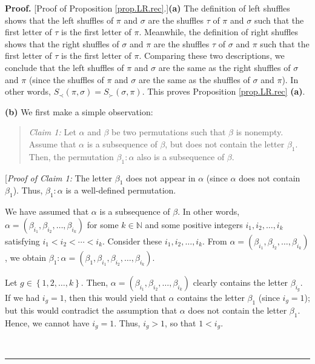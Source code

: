 \documentclass[numbers=enddot,12pt,final,onecolumn,notitlepage]{scrartcl}%
\theoremstyle{definition}
\newenvironment{statement}{\begin{quote}}{\end{quote}}
\newenvironment{proof}[1][Proof]{\noindent\textbf{#1.} }{\ \rule{0.5em}{0.5em}}
\newenvironment{verlong}{}{}
\begin{document}
\begin{verlong}
\begin{proof}
[Proof of Proposition \ref{prop.LR.rec}.]\textbf{(a)} The definition of left
shuffles shows that the left shuffles of $\pi$ and $\sigma$ are the shuffles
$\tau$ of $\pi$ and $\sigma$ such that the first letter of $\tau$ is the first
letter of $\pi$. Meanwhile, the definition of right shuffles shows that the
right shuffles of $\sigma$ and $\pi$ are the shuffles $\tau$ of $\sigma$ and
$\pi$ such that the first letter of $\tau$ is the first letter of $\pi$.
Comparing these two descriptions, we conclude that the left shuffles of $\pi$
and $\sigma$ are the same as the right shuffles of $\sigma$ and $\pi$ (since
the shuffles of $\pi$ and $\sigma$ are the same as the shuffles of $\sigma$
and $\pi$). In other words, $S_{\prec}\left(  \pi,\sigma\right)  =S_{\succ
}\left(  \sigma,\pi\right)  $. This proves Proposition \ref{prop.LR.rec}
\textbf{(a)}.

\textbf{(b)} We first make a simple observation:

\begin{statement}
\textit{Claim 1:} Let $\alpha$ and $\beta$ be two permutations such that
$\beta$ is nonempty. Assume that $\alpha$ is a subsequence of $\beta$,
but does not contain the letter $\beta_{1}$. Then, the permutation $\beta
_{1}:\alpha$ also is a subsequence of $\beta$.
\end{statement}

[\textit{Proof of Claim 1:} The letter $\beta_{1}$ does not appear in $\alpha$
(since $\alpha$ does not contain $\beta_{1}$). Thus, $\beta_{1}:\alpha$ is a
well-defined permutation.

We have assumed that $\alpha$ is a subsequence of $\beta$. In other
words, $\alpha=\left(  \beta_{i_{1}},\beta_{i_{2}},\ldots,\beta_{i_{k}%
}\right)  $ for some $k\in\mathbb{N}$ and some positive integers $i_{1}%
,i_{2},\ldots,i_{k}$ satisfying $i_{1}<i_{2}<\cdots<i_{k}$. Consider these
$i_{1},i_{2},\ldots,i_{k}$. From $\alpha=\left(  \beta_{i_{1}},\beta_{i_{2}%
},\ldots,\beta_{i_{k}}\right)  $, we obtain $\beta_{1}:\alpha=\left(
\beta_{1},\beta_{i_{1}},\beta_{i_{2}},\ldots,\beta_{i_{k}}\right)  $.

Let $g\in\left\{  1,2,\ldots,k\right\}  $. Then, $\alpha=\left(  \beta_{i_{1}%
},\beta_{i_{2}},\ldots,\beta_{i_{k}}\right)  $ clearly contains the letter
$\beta_{i_{g}}$. If we had $i_{g}=1$, then this would yield that $\alpha$
contains the letter $\beta_{1}$ (since $i_{g}=1$); but this would contradict
the assumption that $\alpha$ does not contain the letter $\beta_{1}$. Hence,
we cannot have $i_{g}=1$. Thus, $i_{g}>1$, so that $1<i_{g}$.


\end{proof}
\end{verlong}
\end{document}
